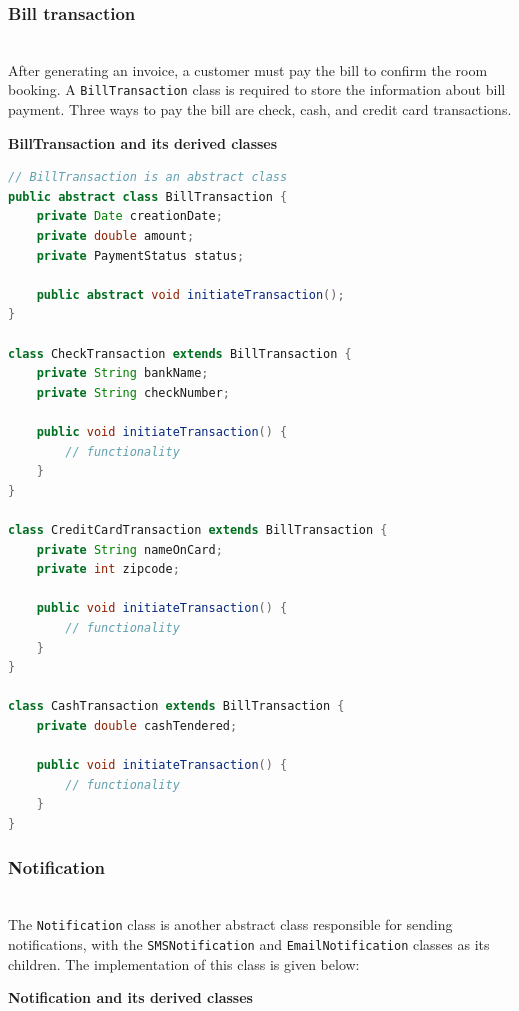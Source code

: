 \subsubsection{Bill transaction}\label{DpNAhdkSnHg7DcMraAzeH-1}
\\
After generating an invoice, a customer must pay the bill to confirm the room booking. A \texttt{BillTransaction} class is required to store the information about bill payment. Three ways to pay the bill are check, cash, and credit card transactions.

\textbf{BillTransaction and its derived classes}

\begin{lstlisting}[language=Java]
// BillTransaction is an abstract class
public abstract class BillTransaction {
    private Date creationDate;
    private double amount;      
    private PaymentStatus status;

    public abstract void initiateTransaction();
}

class CheckTransaction extends BillTransaction {
    private String bankName;
    private String checkNumber;

    public void initiateTransaction() {
        // functionality 
    }
}

class CreditCardTransaction extends BillTransaction {
    private String nameOnCard;
    private int zipcode;

    public void initiateTransaction() {
        // functionality 
    }
}

class CashTransaction extends BillTransaction {
    private double cashTendered;

    public void initiateTransaction() {
        // functionality 
    }
}
\end{lstlisting}

\subsubsection{Notification}\label{DpNAhdkSnHg7DcMraAzeH-2}
\\
The \texttt{Notification} class is another abstract class responsible for sending notifications, with the \texttt{SMSNotification} and \texttt{EmailNotification} classes as its children. The implementation of this class is given below:

\textbf{Notification and its derived classes}

